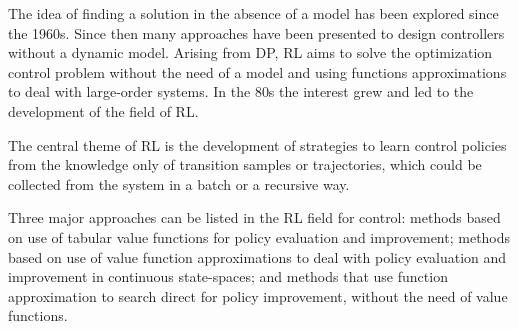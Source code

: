 The idea of finding a solution in the absence of a model has been explored since 
the 1960s.
Since then many approaches have been presented to design controllers without a dynamic model. 
Arising from DP, RL aims to solve the optimization control problem without the need of a model and using functions approximations to deal with large-order systems.
In the 80s the interest grew and led to the development of the field of RL. 

The central theme of RL is the development of strategies to learn control policies from the knowledge only of transition samples or trajectories, which could be collected from the system in a batch or a recursive way. 



Three major approaches can be listed in the RL field for control: methods based on use of tabular value functions for policy evaluation and improvement; methods based on use of value function approximations to deal with policy evaluation and improvement in continuous state-spaces; and methods that use function approximation to search direct for policy improvement, without the need of value functions.  

